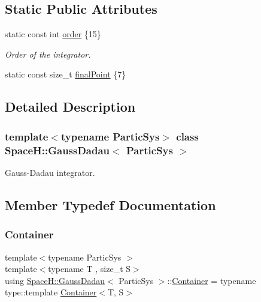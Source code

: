 \subsection*{Static Public Attributes}
\begin{DoxyCompactItemize}
\item 
static const int \mbox{\hyperlink{class_space_h_1_1_gauss_dadau_aa306d2c64787f9a38901bdddc791c938}{order}} \{15\}
\begin{DoxyCompactList}\small\item\em Order of the integrator. \end{DoxyCompactList}\item 
static const size\+\_\+t \mbox{\hyperlink{class_space_h_1_1_gauss_dadau_ac671afa9ebffbf85891ba283076d04f1}{final\+Point}} \{7\}
\end{DoxyCompactItemize}


\subsection{Detailed Description}
\subsubsection*{template$<$typename Partic\+Sys$>$\newline
class Space\+H\+::\+Gauss\+Dadau$<$ Partic\+Sys $>$}

Gauss-\/\+Dadau integrator. 

\subsection{Member Typedef Documentation}
\mbox{\label{class_space_h_1_1_gauss_dadau_adccd45f5653523a6ae7bb0da0c244b5d}} 
\subsubsection{\texorpdfstring{Container}{Container}}
{\footnotesize\ttfamily template$<$typename Partic\+Sys $>$ \\
template$<$typename T , size\+\_\+t S$>$ \\
using \mbox{\hyperlink{class_space_h_1_1_gauss_dadau}{Space\+H\+::\+Gauss\+Dadau}}$<$ Partic\+Sys $>$\+::\mbox{\hyperlink{class_space_h_1_1_gauss_dadau_adccd45f5653523a6ae7bb0da0c244b5d}{Container}} =  typename type\+::template \mbox{\hyperlink{class_space_h_1_1_gauss_dadau_adccd45f5653523a6ae7bb0da0c244b5d}{Container}}$<$T, S$>$}

